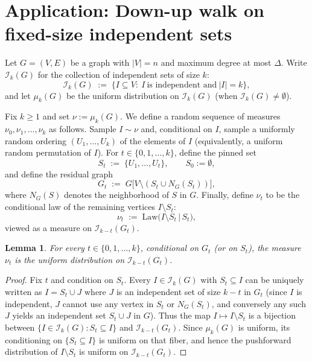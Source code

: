 \documentclass[11pt,reqno,letterpaper]{amsart}
\newcommand{\cI}{\mathcal{I}}
\numberwithin{equation}{section}
\newtheorem{lemma}[theorem]{Lemma}
\theoremstyle{definition}
\begin{document}
\section{Application: Down-up walk on fixed-size independent sets}
\label{sec:application}


Let $G=(V,E)$ be a graph with $|V|=n$ and maximum degree at most $\Delta$.
Write $\cI_k(G)$ for the collection of independent sets of size $k$:
\[
\cI_k(G)\;:=\;\{I\subseteq V:\ I\ \text{is independent and}\ |I|=k\},
\]
and let $\mu_k(G)$ be the uniform distribution on $\cI_k(G)$ (when $\cI_k(G)\neq\emptyset$).


Fix $k\ge 1$ and set $\nu:=\mu_k(G)$.
We define a random sequence of measures $\nu_0,\nu_1,\dots,\nu_k$ as follows.
Sample $I\sim \nu$ and, conditional on $I$, sample a uniformly random ordering
$(U_1,\dots,U_k)$ of the elements of $I$ (equivalently, a uniform random permutation of $I$).
For $t\in\{0,1,\dots,k\}$, define the pinned set
\[
S_t \;:=\; \{U_1,\dots,U_t\},
\qquad S_0:=\emptyset,
\]
and define the {residual graph}
\begin{equation}
\label{eq:residual_graph_def}
G_t \;:=\; G\big[V\setminus (S_t\cup N_G(S_t))\big],
\end{equation}
where $N_G(S)$ denotes the neighborhood of $S$ in $G$.
Finally, define $\nu_t$ to be the conditional law of the {remaining} vertices $I\setminus S_t$:
\begin{equation}
\label{eq:nut_def}
\nu_t \;:=\; \mathrm{Law}\big(I\setminus S_t \,\big|\, S_t\big),
\end{equation}
viewed as a measure on $\cI_{k-t}(G_t)$.

\begin{lemma}
\label{lem:uniformity_residual}
For every $t\in\{0,1,\dots,k\}$, conditional on $G_t$ (or on $S_t$), the measure $\nu_t$
is the uniform distribution on $\cI_{k-t}(G_t)$.
\end{lemma}

\begin{proof}
Fix $t$ and condition on $S_t$.
Every $I\in\cI_k(G)$ with $S_t\subseteq I$ can be uniquely written as $I=S_t\cup J$ where
$J$ is an independent set of size $k-t$ in $G_t$ (since $I$ is independent, $J$ cannot use any vertex in
$S_t$ or $N_G(S_t)$, and conversely any such $J$ yields an independent set $S_t\cup J$ in $G$).
Thus the map $I\mapsto I\setminus S_t$ is a bijection between
$\{I\in\cI_k(G): S_t\subseteq I\}$ and $\cI_{k-t}(G_t)$.
Since $\mu_k(G)$ is uniform, its conditioning on $\{S_t\subseteq I\}$ is uniform on that fiber, and hence
the pushforward distribution of $I\setminus S_t$ is uniform on $\cI_{k-t}(G_t)$.
\end{proof}
\end{document}
